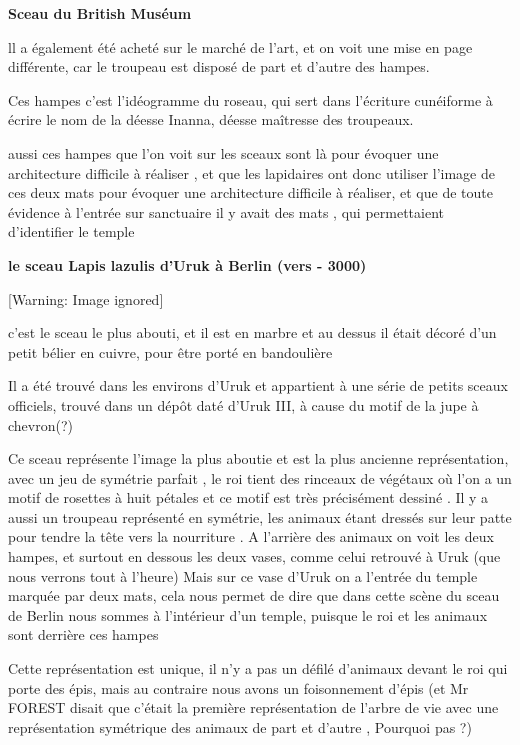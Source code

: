 \documentclass[a4paper,10pt]{article}
\newcommand{\DirImg}{../img/FaivreMartin/}
\begin{document}
\textbf{Sceau du British Muséum}

ll a également été acheté sur le marché de l'art, et on
voit une mise en page différente, car le troupeau est disposé de part
et d'autre des hampes.

Ces hampes c'est l'idéogramme du
roseau, qui sert dans l'écriture cunéiforme à écrire
le nom de la déesse Inanna, déesse maîtresse des troupeaux.

aussi ces hampes que l'on voit sur les sceaux sont là
pour évoquer une architecture difficile à réaliser , et que les
lapidaires ont donc utiliser l'image de ces deux mats
pour évoquer une architecture difficile à réaliser, et que de toute
évidence à l'entrée sur sanctuaire il y avait des mats
, qui permettaient d'identifier le temple

\textbf{le sceau Lapis lazulis d'Uruk à Berlin (vers -
3000)}

  [Warning: Image ignored] %
 

c'est le sceau le plus abouti, et il est en marbre et
au dessus il était décoré d'un petit bélier en cuivre,
pour être porté en bandoulière

Il a été trouvé dans les environs d'Uruk et appartient
à une série de petits sceaux officiels, trouvé dans un dépôt daté
d'Uruk III, à cause du motif de la jupe à chevron(?)

Ce sceau représente l'image la plus aboutie et est la
plus ancienne représentation, avec un jeu de symétrie parfait , le roi
tient des rinceaux de végétaux où l'on a un motif de
rosettes à huit pétales et ce motif est très précisément dessiné . Il y
a aussi un troupeau représenté en symétrie, les animaux étant dressés
sur leur patte pour tendre la tête vers la nourriture . A
l'arrière des animaux on voit les deux hampes, et
surtout en dessous les deux vases, comme celui retrouvé à Uruk (que
nous verrons tout à l'heure) Mais sur ce vase
d'Uruk on a l'entrée du temple
marquée par deux mats, cela nous permet de dire que dans cette scène du
sceau de Berlin nous sommes à l'intérieur
d'un temple, puisque le roi et les animaux sont
derrière ces hampes

Cette représentation est unique, il n'y a pas un défilé
d'animaux devant le roi qui porte des épis,  mais au
contraire nous avons un foisonnement d'épis (et Mr
FOREST disait que c'était la première représentation
de l'arbre de vie avec une représentation symétrique
des animaux de part et d'autre , Pourquoi pas ?)
\end{document}
